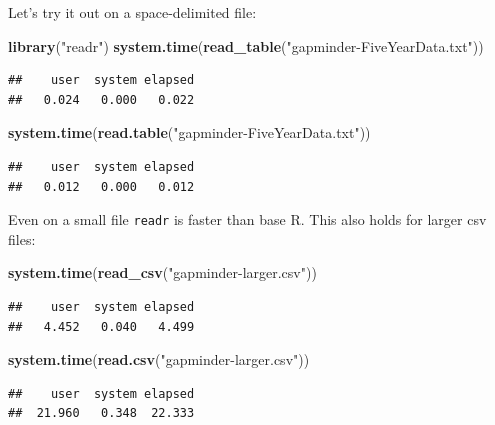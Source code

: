 \documentclass[]{article}
\newenvironment{Shaded}{\begin{snugshade}}{\end{snugshade}}
\newcommand{\KeywordTok}[1]{\textcolor[rgb]{0.13,0.29,0.53}{\textbf{{#1}}}}
\newcommand{\StringTok}[1]{\textcolor[rgb]{0.31,0.60,0.02}{{#1}}}
\newcommand{\NormalTok}[1]{{#1}}
\begin{document}
Let's try it out on a space-delimited file:

\begin{Shaded}
\begin{Highlighting}[]
\KeywordTok{library}\NormalTok{(}\StringTok{"readr"}\NormalTok{)}
\KeywordTok{system.time}\NormalTok{(}\KeywordTok{read_table}\NormalTok{(}\StringTok{"gapminder-FiveYearData.txt"}\NormalTok{))}
\end{Highlighting}
\end{Shaded}

\begin{verbatim}
##    user  system elapsed 
##   0.024   0.000   0.022
\end{verbatim}

\begin{Shaded}
\begin{Highlighting}[]
\KeywordTok{system.time}\NormalTok{(}\KeywordTok{read.table}\NormalTok{(}\StringTok{"gapminder-FiveYearData.txt"}\NormalTok{))}
\end{Highlighting}
\end{Shaded}

\begin{verbatim}
##    user  system elapsed 
##   0.012   0.000   0.012
\end{verbatim}

Even on a small file \texttt{readr} is faster than base R. This also
holds for larger csv files:

\begin{Shaded}
\begin{Highlighting}[]
\KeywordTok{system.time}\NormalTok{(}\KeywordTok{read_csv}\NormalTok{(}\StringTok{"gapminder-larger.csv"}\NormalTok{))}
\end{Highlighting}
\end{Shaded}

\begin{verbatim}
##    user  system elapsed 
##   4.452   0.040   4.499
\end{verbatim}

\begin{Shaded}
\begin{Highlighting}[]
\KeywordTok{system.time}\NormalTok{(}\KeywordTok{read.csv}\NormalTok{(}\StringTok{"gapminder-larger.csv"}\NormalTok{))}
\end{Highlighting}
\end{Shaded}

\begin{verbatim}
##    user  system elapsed 
##  21.960   0.348  22.333
\end{verbatim}
\end{document}
